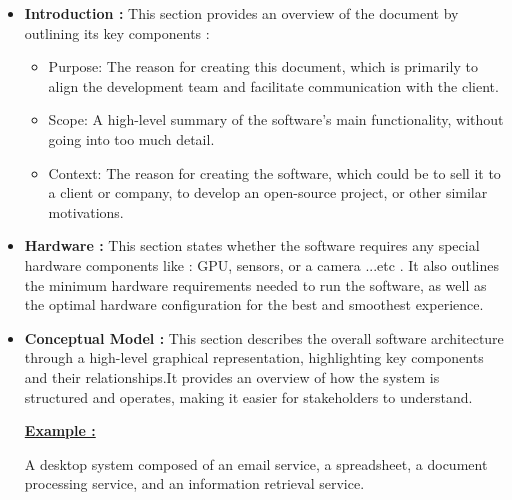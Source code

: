 \begin{itemize}
   \item \textbf{Introduction : }This section provides an overview of the document by outlining its key components :
      \begin{itemize} 
          \item Purpose: The reason for creating this document, which is primarily to align the development team and facilitate
           communication with the client.
           \vspace{0.15cm}
          \item Scope: A high-level summary of the software’s main functionality, without going into too much detail. 
           \vspace{0.15cm}
          \item Context: The reason for creating the software, which could be to sell it to a client or company, to develop an
          open-source project, or other similar motivations.\\
      \end{itemize}    
    \item \textbf{Hardware : }This section states whether the software requires any special hardware components like : GPU,
sensors, or a camera ...etc . It also outlines the minimum hardware requirements needed to run the software, as well as the optimal hardware configuration for the best and smoothest experience.
    \item \textbf{Conceptual Model : }This section describes the overall software architecture through a high-level graphical
        representation, highlighting key components and their relationships.\hspace{0.1cm}It provides an overview of how the system is structured and
operates, making it easier for stakeholders to understand.

\textbf{\underline{Example :}}

A desktop system composed of an email service, a spreadsheet, a document processing service, and an information retrieval service.
\end{itemize}
